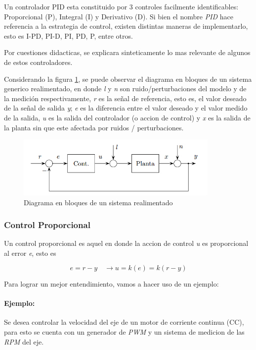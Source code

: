 \documentclass[10pt,conference,a4paper,onecolumn]{article}%
\begin{document}
Un controlador PID esta constituido por 3 controles facilmente identificables: Proporcional (P), Integral (I) y Derivativo (D). Si bien el nombre \textit{PID} hace referencia a la estrategia de control, existen distintas maneras de implementarlo, esto es I-PD, PI-D, PI, PD, P, entre otros. 

Por cuestiones didacticas, se explicara sinteticamente lo mas relevante de algunos de estos controladores.%


Considerando la figura \ref{fig:sis_generico}, se puede observar el diagrama en bloques de un sistema generico realimentado, en donde \textit{l} y \textit{n} son ruido/perturbaciones del modelo y de la medición respectivamente,   \textit{r} es la señal de referencia, esto es, el valor deseado de la señal de salida \textit{y}; \textit{e} es la diferencia entre el valor deseado y el valor medido de la salida,    \textit{u} es la salida del controlador (o accion de control) y  \textit{x} es la salida de la planta sin que este afectada por ruidos / perturbaciones.

\begin{figure}[h]
\centering
\includegraphics[height=3cm]{./imagenes/sis_realim_generico.png}
\caption{Diagrama en bloques de un sistema realimentado}
\label{fig:sis_generico}
\end{figure}


\subsubsection{Control Proporcional}
Un control proporcional es aquel en donde la accion de control \textit{u} es proporcional al error \textit{e}, esto es

\begin{equation}
e=r-y \quad \rightarrow u=k(e)=k (r-y)
\end{equation}

Para lograr un mejor entendimiento, vamos a hacer uso de un ejemplo:
\paragraph{Ejemplo:} Se desea controlar la velocidad del eje de un motor de corriente continua (CC), para esto se cuenta con un generador de \textit{PWM} y un sistema de medicion de las \textit{RPM} del eje.
\end{document}
